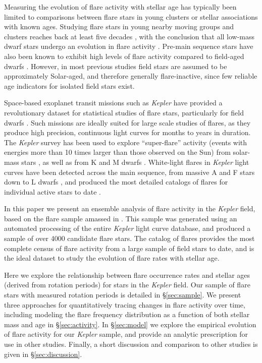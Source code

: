 \documentclass[preprint2]{aastex62}
\newcommand{\Kepler}{\textsl{Kepler}\xspace}
\begin{document}
Measuring the evolution of flare activity with stellar age has typically been limited to comparisons between flare stars in young clusters or stellar associations with known ages. Studying flare stars in young nearby moving groups and clusters reaches back at least five decades \citep{haro1966}, with the conclusion that all low-mass dwarf stars undergo an evolution in flare activity \citep{ambartsumian1975}. Pre-main sequence stars have also been known to exhibit high levels of flare activity compared to field-aged dwarfs \citep[e.g.][]{feigelson2001}. However, in most previous studies field stars are assumed to be approximately Solar-aged, and therefore generally flare-inactive, since few reliable age indicators for isolated field stars exist.


Space-based exoplanet transit missions such as \Kepler \citep{borucki2010} have provided a revolutionary dataset for statistical studies of flare stars, particularly for field dwarfs \citep{walkowicz2011}. Such missions are ideally suited for large scale studies of flares, as they produce high precision, continuous light curves for months to years in duration. The \Kepler survey has been used to explore ``super-flare'' activity (events with energies more than 10 times larger than those observed on the Sun) from solar-mass stars \citep{shibayama2013}, as well as from K and M dwarfs \citep{candelaresi2014}. White-light flares in \Kepler light curves have been detected across the main sequence, from massive A and F stars \citep{balona2012} down to L dwarfs \citep{gizis2013}, and produced the most detailed catalogs of flares for individual active stars to date \citep{hawley2014,davenport2014b}. 


In this paper we present an ensemble analysis of flare activity in the \Kepler field, based on the flare sample amassed in \citet{davenport2016}. This sample was generated using an automated processing of the entire \Kepler light curve database, and produced a sample of over 4000 candidate flare stars. The \citet{davenport2016} catalog of flares provides the most complete census of flare activity from a large sample of field stars to date, and is the ideal dataset to study the evolution of flare rates with stellar age.


Here we explore the relationship between flare occurrence rates and stellar ages (derived from rotation periods) for stars in the \Kepler field. Our sample of flare stars with measured rotation periods is detailed in \S\ref{sec:sample}. We present three approaches for quantitatively tracing changes in flare activity over time, including modeling the flare frequency distribution as a function of both stellar mass and age in \S\ref{sec:activity}. In \S\ref{sec:model} we explore the empirical evolution of flare activity for our \Kepler sample, and provide an analytic prescription for use in other studies. Finally, a short discussion and comparison to other studies is given in \S\ref{sec:discussion}.
\end{document}
